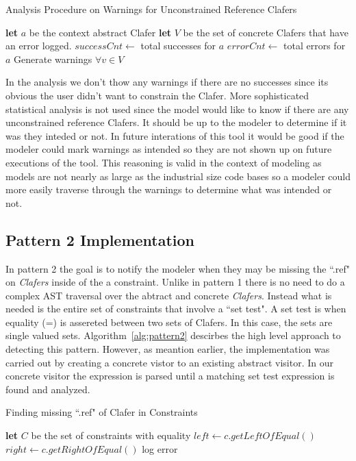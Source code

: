 \documentclass[10pt,oneside]{IEEEtran}
\begin{document}
\begin{algorithm}[H]
\caption{Analysis Procedure on Warnings for Unconstrained Reference Clafers}\label{alg:pattern1Stats}
\begin{algorithmic}[1]
  \State \textbf{let} $a$ be the context abstract Clafer
  \State \textbf{let} $V$ be the set of concrete Clafers that have an error logged.
  \State $successCnt \gets $ total successes for $a$
  \State $errorCnt \gets $ total errors for $a$
    \State Generate warnings $\forall v \in V$
  \EndIf
\EndProcedure
\end{algorithmic}
\end{algorithm}

In the analysis we don't thow any warnings if there are no successes since its obvious the user didn't want to constrain the Clafer. More sophisticated statistical analysis is not used since the model would like to know if there are any unconstrained reference Clafers. It should be up to the modeler to determine if it was they inteded or not. In future interations of this tool it would be good if the modeler could mark warnings as intended so they are not shown up on future executions of the tool. This reasoning is valid in the context of modeling as models are not nearly as large as the industrial size code bases so a modeler could more easily traverse through the warnings to determine what was intended or not.

\subsection{Pattern 2 Implementation}
In pattern 2 the goal is to notify the modeler when they may be missing the ``.ref" on  \textit{Clafers} inside of the a constraint. Unlike in pattern 1 there is no need to do a complex AST traversal over the abtract and concrete \textit{Clafers}. Instead what is needed is the entire set of constraints that involve a ``set test". A set test is when equality (=) is assereted between two sets of Clafers. In this case, the sets are single valued sets. Algorithm~\ref{alg:pattern2} descirbes the high level approach to detecting this pattern. However, as meantion earlier, the implementation was carried out by creating a concrete vistor to an existing abstract visitor. In our concrete visitor the expression is parsed until a matching set test expression is found and analyzed.

\begin{algorithm}[H]
\caption{Finding missing ``.ref" of Clafer in Constraints}\label{alg:pattern2}
\begin{algorithmic}[1]
  \State \textbf{let} $C$ be the set of constraints with equality
    \State $left \gets c.getLeftOfEqual()$
    \State $right \gets c.getRightOfEqual()$
        \State log error
      \EndIf
    \EndIf
  \EndFor
\EndProcedure
\end{algorithmic}
\end{algorithm}
\end{document}
